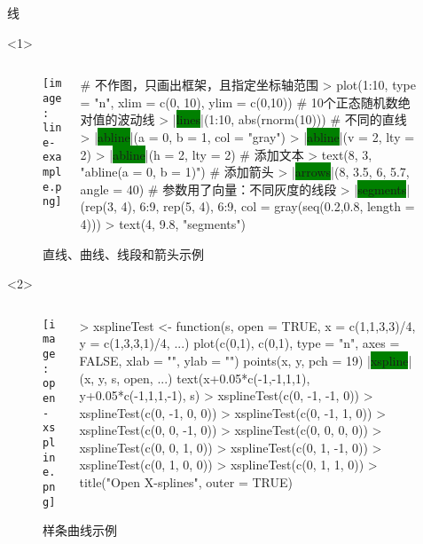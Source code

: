 \begin{frame}[c,fragile]{\subsecname}{线}
\begin{onlyenv}<1>
    \begin{figure}
 \begin{columns}
    \begin{column}[c]{.4\textwidth}
        \texttt{[image: line-example.png]}
    \end{column}

    \begin{column}[c]{.6\textwidth}
\begin{rcode}
# 不作图，只画出框架，且指定坐标轴范围
> plot(1:10, type = "n", xlim = c(0, 10), ylim = c(0,10))
# 10个正态随机数绝对值的波动线
> |\colorbox{green}{lines}|(1:10, abs(rnorm(10)))
# 不同的直线
> |\colorbox{green}{abline}|(a = 0, b = 1, col = "gray")
> |\colorbox{green}{abline}|(v = 2, lty = 2)
> |\colorbox{green}{abline}|(h = 2, lty = 2)
# 添加文本
> text(8, 3, "abline(a = 0, b = 1)")
# 添加箭头
> |\colorbox{green}{arrows}|(8, 3.5, 6, 5.7, angle = 40)
# 参数用了向量：不同灰度的线段
> |\colorbox{green}{segments}|(rep(3, 4), 6:9, rep(5, 4), 6:9, col = gray(seq(0.2,0.8, length = 4)))
> text(4, 9.8, "segments")
\end{rcode}
    \end{column}
  \end{columns}
  \caption{直线、曲线、线段和箭头示例}
\end{figure}
\end{onlyenv}

\begin{onlyenv}<2>
\begin{figure}
  \begin{columns}
    \begin{column}[c]{.4\textwidth}
        \texttt{[image: open-xspline.png]}
    \end{column}

    \begin{column}[c]{.6\textwidth}
\begin{rcode}
> xsplineTest <- function(s, open = TRUE, x = c(1,1,3,3)/4, y = c(1,3,3,1)/4, ...) {
  plot(c(0,1), c(0,1), type = "n", axes = FALSE, xlab = "", ylab = "")
  points(x, y, pch = 19)
  |\colorbox{green}{xspline}|(x, y, s, open, ...)
  text(x+0.05*c(-1,-1,1,1), y+0.05*c(-1,1,1,-1), s)}
> xsplineTest(c(0, -1, -1, 0))
> xsplineTest(c(0, -1,  0, 0))
> xsplineTest(c(0, -1,  1, 0))
> xsplineTest(c(0,  0, -1, 0))
> xsplineTest(c(0,  0,  0, 0))
> xsplineTest(c(0,  0,  1, 0))
> xsplineTest(c(0,  1, -1, 0))
> xsplineTest(c(0,  1,  0, 0))
> xsplineTest(c(0,  1,  1, 0))
> title("Open X-splines", outer = TRUE)
\end{rcode}
    \end{column}
  \end{columns}
  \caption{样条曲线示例}
\end{figure}
\end{onlyenv}  
\end{frame}

